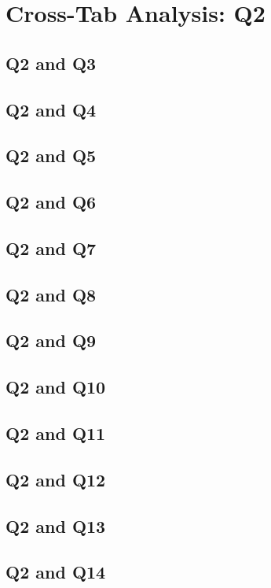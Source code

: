 \documentclass{report}
\begin{document}
\chapter{Cross-Tab Analysis: Q2}

\section{Q2 and Q3}\clearpage
\section{Q2 and Q4}\clearpage
\section{Q2 and Q5}\clearpage
\section{Q2 and Q6}\clearpage
\section{Q2 and Q7}\clearpage
\section{Q2 and Q8}\clearpage
\section{Q2 and Q9}\clearpage
\section{Q2 and Q10}\clearpage
\section{Q2 and Q11}\clearpage
\section{Q2 and Q12}\clearpage
\section{Q2 and Q13}\clearpage
\section{Q2 and Q14}\clearpage
\end{document}
